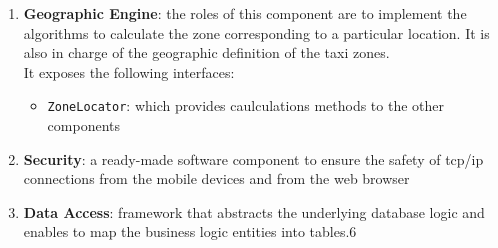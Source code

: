 \begin{enumerate}
\begin{itemize}
	\end{itemize}
	\item \textbf{Geographic Engine}: the roles of this component are to implement the algorithms to calculate the zone corresponding to a particular location. It is also in charge of the geographic definition of the taxi zones.\\It exposes the following interfaces:
	\begin{itemize}
		\item \texttt{ZoneLocator}: which provides caulculations methods to the other components
	\end{itemize}
	\item \textbf{Security}: a ready-made software component to ensure the safety of tcp/ip connections from the mobile devices and from the web browser
	\item \textbf{Data Access}: framework that abstracts the underlying database logic and enables to map the business logic entities into tables.6
\end{enumerate}